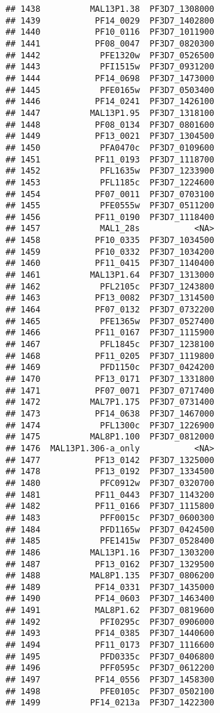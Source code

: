 \documentclass{article}\usepackage[]{graphicx}\usepackage[]{color}
\makeatletter
\newenvironment{kframe}{%
 \def\at@end@of@kframe{}%
 \ifinner\ifhmode%
  \def\at@end@of@kframe{\end{minipage}}%
  \begin{minipage}{\columnwidth}%
 \fi\fi%
 \def\FrameCommand##1{\hskip\@totalleftmargin \hskip-\fboxsep
 \colorbox{shadecolor}{##1}\hskip-\fboxsep
     \hskip-\linewidth \hskip-\@totalleftmargin \hskip\columnwidth}%
 \MakeFramed {\advance\hsize-\width
   \@totalleftmargin\z@ \linewidth\hsize
   \@setminipage}}%
 {\par\unskip\endMakeFramed%
 \at@end@of@kframe}
\newenvironment{knitrout}{}{} %
\makeatother
\begin{document}
\begin{knitrout}
\begin{kframe}
\begin{verbatim}
## 1438          MAL13P1.38  PF3D7_1308000
## 1439           PF14_0029  PF3D7_1402800
## 1440           PF10_0116  PF3D7_1011900
## 1441           PF08_0047  PF3D7_0820300
## 1442            PFE1320w  PF3D7_0526500
## 1443            PFI1515w  PF3D7_0931200
## 1444           PF14_0698  PF3D7_1473000
## 1445            PFE0165w  PF3D7_0503400
## 1446           PF14_0241  PF3D7_1426100
## 1447          MAL13P1.95  PF3D7_1318100
## 1448           PF08_0134  PF3D7_0801600
## 1449           PF13_0021  PF3D7_1304500
## 1450            PFA0470c  PF3D7_0109600
## 1451           PF11_0193  PF3D7_1118700
## 1452            PFL1635w  PF3D7_1233900
## 1453            PFL1185c  PF3D7_1224600
## 1454           PF07_0011  PF3D7_0703100
## 1455            PFE0555w  PF3D7_0511200
## 1456           PF11_0190  PF3D7_1118400
## 1457            MAL1_28s           <NA>
## 1458           PF10_0335  PF3D7_1034500
## 1459           PF10_0332  PF3D7_1034200
## 1460           PF11_0415  PF3D7_1140400
## 1461          MAL13P1.64  PF3D7_1313000
## 1462            PFL2105c  PF3D7_1243800
## 1463           PF13_0082  PF3D7_1314500
## 1464           PF07_0132  PF3D7_0732200
## 1465            PFE1365w  PF3D7_0527400
## 1466           PF11_0167  PF3D7_1115900
## 1467            PFL1845c  PF3D7_1238100
## 1468           PF11_0205  PF3D7_1119800
## 1469            PFD1150c  PF3D7_0424200
## 1470           PF13_0171  PF3D7_1331800
## 1471           PF07_0071  PF3D7_0717400
## 1472          MAL7P1.175  PF3D7_0731400
## 1473           PF14_0638  PF3D7_1467000
## 1474            PFL1300c  PF3D7_1226900
## 1475          MAL8P1.100  PF3D7_0812000
## 1476  MAL13P1.306-a_only           <NA>
## 1477           PF13_0142  PF3D7_1325000
## 1478           PF13_0192  PF3D7_1334500
## 1480            PFC0912w  PF3D7_0320700
## 1481           PF11_0443  PF3D7_1143200
## 1482           PF11_0166  PF3D7_1115800
## 1483            PFF0015c  PF3D7_0600300
## 1484            PFD1165w  PF3D7_0424500
## 1485            PFE1415w  PF3D7_0528400
## 1486          MAL13P1.16  PF3D7_1303200
## 1487           PF13_0162  PF3D7_1329500
## 1488          MAL8P1.135  PF3D7_0806200
## 1489           PF14_0331  PF3D7_1435000
## 1490           PF14_0603  PF3D7_1463400
## 1491           MAL8P1.62  PF3D7_0819600
## 1492            PFI0295c  PF3D7_0906000
## 1493           PF14_0385  PF3D7_1440600
## 1494           PF11_0173  PF3D7_1116600
## 1495            PFD0335c  PF3D7_0406800
## 1496            PFF0595c  PF3D7_0612200
## 1497           PF14_0556  PF3D7_1458300
## 1498            PFE0105c  PF3D7_0502100
## 1499          PF14_0213a  PF3D7_1422300

\end{verbatim}
\end{kframe}
\end{knitrout}
\end{document}
